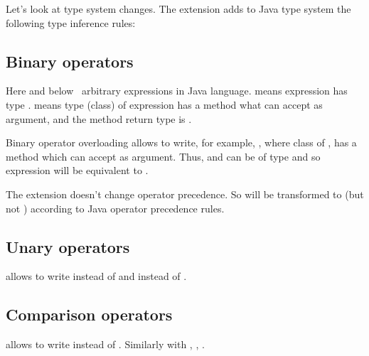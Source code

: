 \documentclass{aircc}
\begin{document}
Let's look at type system changes. 
The extension adds to Java type system the following type inference rules:

\subsection{Binary operators}
Here and below  \textemdash~arbitrary expressions in Java language.
 means expression  has type .
 means type (class) of expression  has a method  what can accept  as argument,
and the method return type is .

Binary operator overloading allows to write, for example, , 
where class of , has a method  which can accept  as argument.
Thus,  and  can be of type  and so expression  will be equivalent to . 

The extension doesn't change operator precedence. So  will be transformed to  (but not ) according to Java operator precedence rules.

\subsection{Unary operators}
allows to write  instead of  and  instead of .

\subsection{Comparison operators}
\begin{mathpar}
\end{mathpar}
allows to write  instead of . Similarly with , , .
\end{document}
